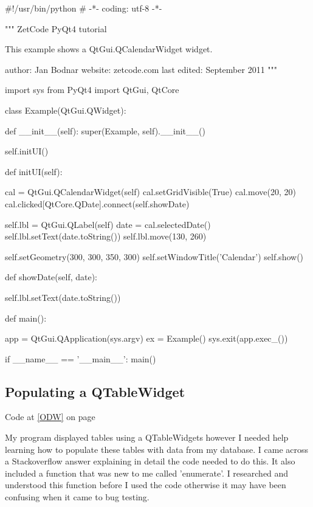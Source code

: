\begin{python}
#!/usr/bin/python
# -*- coding: utf-8 -*-

"""
ZetCode PyQt4 tutorial 

This example shows a QtGui.QCalendarWidget widget.

author: Jan Bodnar
website: zetcode.com 
last edited: September 2011
"""

import sys
from PyQt4 import QtGui, QtCore

class Example(QtGui.QWidget):
    
    def __init__(self):
        super(Example, self).__init__()
        
        self.initUI()
    
    
    def initUI(self):      

        cal = QtGui.QCalendarWidget(self)
        cal.setGridVisible(True)
        cal.move(20, 20)
        cal.clicked[QtCore.QDate].connect(self.showDate)
        
        self.lbl = QtGui.QLabel(self)
        date = cal.selectedDate()
        self.lbl.setText(date.toString())
        self.lbl.move(130, 260)
        
        self.setGeometry(300, 300, 350, 300)
        self.setWindowTitle('Calendar')
        self.show()
        
    def showDate(self, date):     
    
        self.lbl.setText(date.toString())
    
    
def main():
    
    app = QtGui.QApplication(sys.argv)
    ex = Example()
    sys.exit(app.exec_())


if __name__ == '__main__':
    main()
\end{python}

\subsection{Populating a QTableWidget}

Code at \ref{ODW} on page \pageref{ODW}

My program displayed tables using a QTableWidgets however I needed help learning how to populate these tables with data from my database. I came across a Stackoverflow answer explaining in detail the code needed to do this. It also included a function that was new to me called 'enumerate'. I researched and understood this function before I used the code otherwise it may have been confusing when it came to bug testing.

